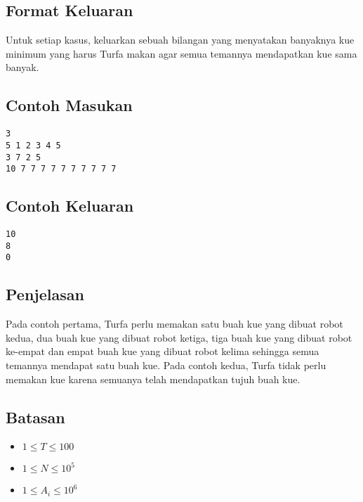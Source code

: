 \documentclass{article}
\begin{document}
\subsection*{Format Keluaran}

\par Untuk setiap kasus, keluarkan sebuah bilangan yang menyatakan banyaknya kue minimum yang harus Turfa makan agar semua temannya mendapatkan kue sama banyak.

\subsection*{Contoh Masukan}

\begin{lstlisting}
3
5 1 2 3 4 5
3 7 2 5
10 7 7 7 7 7 7 7 7 7 7
\end{lstlisting}

\subsection*{Contoh Keluaran}

\begin{lstlisting}
10
8
0
\end{lstlisting}

\subsection*{Penjelasan}

Pada contoh pertama, Turfa perlu memakan satu buah kue yang dibuat robot kedua, dua buah kue yang dibuat robot ketiga, tiga buah kue yang dibuat robot ke-empat dan empat buah kue yang dibuat robot kelima sehingga semua temannya mendapat satu buah kue.
Pada contoh kedua, Turfa tidak perlu memakan kue karena semuanya telah mendapatkan tujuh buah kue.

\subsection*{Batasan}

\begin{itemize}
	\item $1 \leq T \leq 100$
	\item $1 \leq N \leq 10^5$
	\item $1 \leq A_i \leq 10^6$
\end{itemize}
\end{document}
